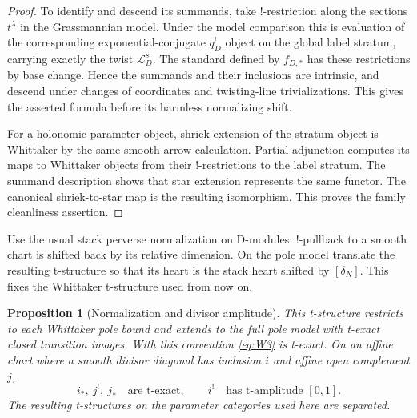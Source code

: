\documentclass[11pt]{article}
\numberwithin{equation}{section}
\newtheorem{proposition}[theorem]{Proposition}
\theoremstyle{definition}
\theoremstyle{remark}
\begin{document}
\begin{proof}
To identify and descend its summands, take $!$-restriction along the
sections $t^\lambda$ in the Grassmannian model. Under the model comparison
this is evaluation of the corresponding exponential-conjugate $q_D^!$
object on the global label stratum, carrying exactly the twist
$\mathcal L_D^s$. The standard defined by $f_{D,*}$ has these restrictions
by base change. Hence the summands and their inclusions are intrinsic,
and descend under changes of coordinates and twisting-line
trivializations. This gives the asserted formula before its harmless
normalizing shift.

For a holonomic parameter object, shriek extension of the stratum object
is Whittaker by the same smooth-arrow calculation. Partial adjunction
computes its maps to Whittaker objects from their $!$-restrictions to the
label stratum. The summand description shows that star extension
represents the same functor. The canonical shriek-to-star map is the
resulting isomorphism. This proves the family cleanliness assertion.
\end{proof}

Use the usual stack perverse normalization on D-modules: $!$-pullback to
a smooth chart is shifted back by its relative dimension. On the pole
model translate the resulting t-structure so that its heart is the stack
heart shifted by $[\delta_N]$. This fixes the Whittaker t-structure used
from now on.

\begin{proposition}[Normalization and divisor amplitude]
\label{whittaker:t-structure}
This t-structure restricts to each Whittaker pole bound and extends to the
full pole model with t-exact closed transition images. With this
convention \eqref{eq:W3} is t-exact. On an affine chart where a smooth
divisor diagonal has inclusion $i$ and affine open complement $j$,
\[
 i_*,\ j^!,\ j_*\quad\text{are t-exact},
 \qquad i^!\quad\text{has t-amplitude }[0,1].
\]
The resulting t-structures on the parameter categories used here are
separated.
\end{proposition}
\end{document}
